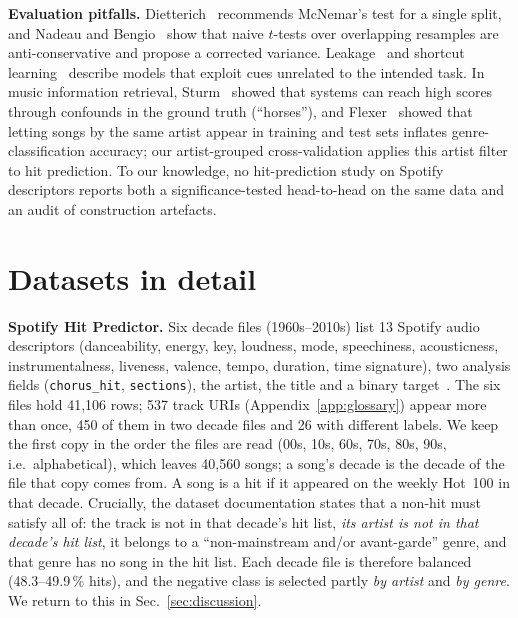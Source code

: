 \textbf{Evaluation pitfalls.} Dietterich~\cite{dietterich1998approximate} recommends
McNemar's test for a single split, and Nadeau and Bengio~\cite{nadeau2003inference} show
that naive $t$-tests over overlapping resamples are anti-conservative and propose a
corrected variance. Leakage~\cite{kaufman2012leakage} and shortcut
learning~\cite{geirhos2020shortcut} describe models that exploit cues unrelated to the
intended task. In music information retrieval, Sturm~\cite{sturm2014simple} showed that
systems can reach high scores through confounds in the ground truth (``horses''), and
Flexer~\cite{flexer2007closer} showed that letting songs by the same artist appear in
training and test sets inflates genre-classification accuracy; our artist-grouped
cross-validation applies this artist filter to hit prediction. To our knowledge, no hit-prediction study on Spotify descriptors reports
both a significance-tested head-to-head on the same data and an audit of construction
artefacts.

\FloatBarrier
\section{Datasets in detail}\label{app:data}

\textbf{Spotify Hit Predictor.} Six decade files (1960s--2010s) list 13 Spotify audio
descriptors (danceability, energy, key, loudness, mode, speechiness, acousticness,
instrumentalness, liveness, valence, tempo, duration, time signature), two analysis
fields (\texttt{chorus\_hit}, \texttt{sections}), the artist, the title and a binary
target~\cite{ansari2020dataset}. The six files hold 41{,}106 rows; 537 track URIs (Appendix~\ref{app:glossary})
appear more than once, 450 of them in two decade files and 26 with different labels. We keep the first copy in the
order the files are read (00s, 10s, 60s, 70s, 80s, 90s, i.e.\ alphabetical), which leaves 40{,}560 songs; a
song's decade is the decade of the file that copy comes from. A song is a hit if it appeared on the weekly Hot~100 in that decade. Crucially,
the dataset documentation states that a non-hit must satisfy all of: the track is not in
that decade's hit list, \emph{its artist is not in that decade's hit list}, it belongs to a
``non-mainstream and/or avant-garde'' genre, and that genre has no song in the hit list.
Each decade file is therefore balanced (48.3--49.9\,\% hits), and the negative class is
selected partly \emph{by artist} and \emph{by genre}. We return to this in
Sec.~\ref{sec:discussion}.

